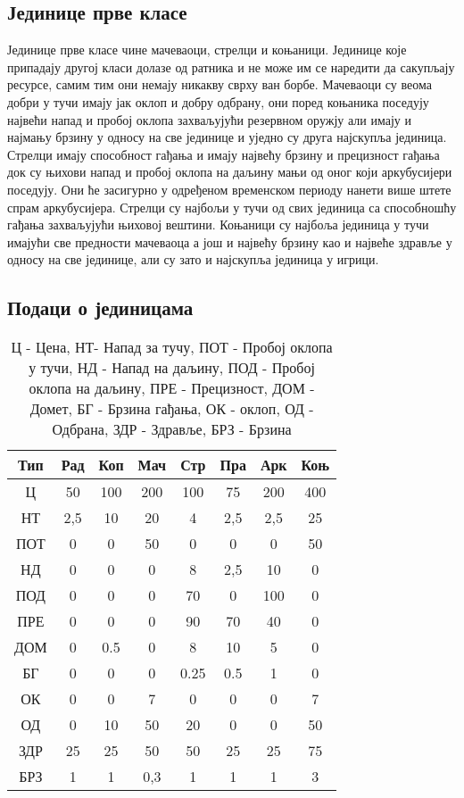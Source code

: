 \documentclass[11pt,a4paper]{article}
\begin{document}
\subsection{Јединице прве класе}
Јединице прве класе чине  мачеваоци, стрелци и коњаници. Јединице које припадају другој класи долазе од ратника и не може им се наредити да сакупљају ресурсе, самим тим они немају никакву сврху ван борбе. Мачеваоци су веома добри у тучи имају јак оклоп и добру одбрану, они поред коњаника поседују највећи напад и пробој оклопа захваљујући резервном оружју али имају и најмању брзину у односу на све јединице и уједно су друга најскупља јединица. Стрелци имају способност гађања и имају највећу брзину и прецизност гађања док су њихови напад и пробој оклопа на даљину мањи од оног који аркубусијери поседују. Они ће засигурно у одређеном временском периоду нанети више штете спрам аркубусијера. Стрелци су најбољи у тучи од свих јединица са способношћу гађања захваљујући њиховој вештини. Коњаници су најбоља јединица у тучи имајући све предности мачеваоца а још и највећу брзину као и највеће здравље у односу на све јединице, али су зато и најскупља јединица у игрици.
\begin{table}[h]
\subsection{Подаци о јединицама}
\centering
\begin{tabular}{|| c || c | c | c | c | c | c | c ||}
\hline
Тип & Рад & Коп & Мач & Стр & Пра & Арк & Коњ \\
\hline\hline
Ц & 50 & 100 & 200 & 100 & 75 & 200 & 400\\
\hline
НТ & 2,5 & 10 & 20 & 4 & 2,5 & 2,5 & 25\\
\hline
ПОТ & 0 & 0 & 50 & 0 & 0 & 0 & 50\\
\hline
НД & 0 & 0 & 0 & 8 & 2,5 & 10 & 0\\
\hline
ПОД & 0 & 0 & 0 & 70 & 0 & 100 & 0\\
\hline
ПРЕ & 0 & 0 & 0 & 90 & 70 & 40 & 0\\
\hline
ДОМ & 0 & 0.5 & 0 & 8 & 10 & 5 & 0\\
\hline
БГ & 0 & 0 & 0 & 0.25 & 0.5 & 1 & 0\\
\hline
ОК & 0 & 0 & 7 & 0 & 0 & 0 & 7\\
\hline
ОД & 0 & 10 & 50 & 20 & 0 & 0 & 50\\
\hline
ЗДР & 25 & 25 & 50 & 50 & 25 & 25 & 75\\
\hline
БРЗ & 1 & 1 & 0,3 & 1 & 1 & 1 & 3 \\
\hline

\end{tabular}
\caption{Ц - Цена, НТ- Напад за тучу, ПОТ - Пробој оклопа у тучи, НД - Напад на даљину, ПОД - Пробој оклопа на даљину, ПРЕ - Прецизност, ДОМ - Домет, БГ - Брзина гађања, ОК - оклоп, ОД - Одбрана, ЗДР - Здравље, БРЗ - Брзина }
\end{table}
\FloatBarrier
\end{document}
